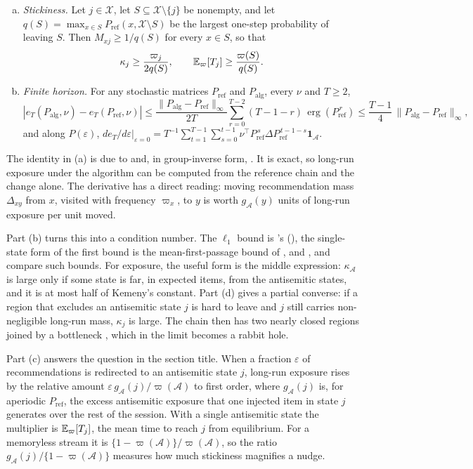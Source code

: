 \begin{theorem}
\begin{enumerate}[(a)]
  \item \emph{Stickiness.} Let $j\in\mathcal X$, let $S\subseteq\mathcal X\setminus\{j\}$ be nonempty, and let $q(S)=\max_{x\in S}P_{\mathrm{ref}}(x,\mathcal X\setminus S)$ be the largest one-step probability of leaving $S$. Then $M_{xj}\ge1/q(S)$ for every $x\in S$, so that
  \[
    \kappa_j\ge\frac{\varpi_j}{2q(S)},\qquad \mathbb{E}_\varpi[T_j]\ge\frac{\varpi(S)}{q(S)}.
  \]
  \item \emph{Finite horizon.} For any stochastic matrices $P_{\mathrm{ref}}$ and $P_{\mathrm{alg}}$, every $\nu$ and $T\ge2$,
  \[
    |e_T(P_{\mathrm{alg}},\nu)-e_T(P_{\mathrm{ref}},\nu)|
    \le\frac{\|P_{\mathrm{alg}}-P_{\mathrm{ref}}\|_\infty}{2T}\sum_{r=0}^{T-2}(T-1-r)\,\operatorname{erg}(P_{\mathrm{ref}}^{\,r})
    \le\frac{T-1}{4}\,\|P_{\mathrm{alg}}-P_{\mathrm{ref}}\|_\infty,
  \]
  and along $P(\varepsilon)$, $de_T/d\varepsilon|_{\varepsilon=0}=T^{-1}\sum_{t=1}^{T-1}\sum_{s=0}^{t-1}\nu^{\top}P_{\mathrm{ref}}^{\,s}\Delta P_{\mathrm{ref}}^{\,t-1-s}\bm1_{\mathcal A}$.
\end{enumerate}
\end{theorem}

The identity in (a) is due to \citet{schweitzer1968} and, in group-inverse form, \citet{meyer1975,meyer1980}. It is exact, so long-run exposure under the algorithm can be computed from the reference chain and the change alone. The derivative has a direct reading: moving recommendation mass $\Delta_{xy}$ from $x$, visited with frequency $\varpi_x$, to $y$ is worth $g_{\mathcal A}(y)$ units of long-run exposure per unit moved.

Part (b) turns this into a condition number. The $\ell_1$ bound is \citeauthor{seneta1988}'s (\citeyear{seneta1988}), the single-state form of the first bound is the mean-first-passage bound of \citet{cho2000}, and \citet{cho2001}, \citet{hunter2006} and \citet{ortner2024} compare such bounds. For exposure, the useful form is the middle expression: $\kappa_{\mathcal A}$ is large only if some state is far, in expected items, from the antisemitic states, and it is at most half of Kemeny's constant. Part (d) gives a partial converse: if a region that excludes an antisemitic state $j$ is hard to leave and $j$ still carries non-negligible long-run mass, $\kappa_j$ is large. The chain then has two nearly closed regions joined by a bottleneck \citep{simon1961}, which in the limit becomes a rabbit hole.

Part (c) answers the question in the section title. When a fraction $\varepsilon$ of recommendations is redirected to an antisemitic state $j$, long-run exposure rises by the relative amount $\varepsilon\,g_{\mathcal A}(j)/\varpi(\mathcal A)$ to first order, where $g_{\mathcal A}(j)$ is, for aperiodic $P_{\mathrm{ref}}$, the excess antisemitic exposure that one injected item in state $j$ generates over the rest of the session. With a single antisemitic state the multiplier is $\mathbb{E}_\varpi[T_j]$, the mean time to reach $j$ from equilibrium. For a memoryless stream it is $\{1-\varpi(\mathcal A)\}/\varpi(\mathcal A)$, so the ratio $g_{\mathcal A}(j)/\{1-\varpi(\mathcal A)\}$ measures how much stickiness magnifies a nudge.

